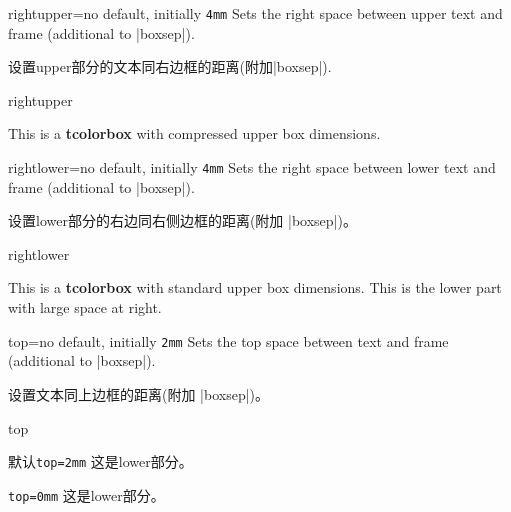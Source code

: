 \begin{docTcbKey}{rightupper}{=}{no default, initially \texttt{4mm}}
  Sets the right space between upper text and frame (additional to |boxsep|).

设置upper部分的文本同右边框的距离(附加|boxsep|).
\begin{exdispExample}{rightupper}

\begin{tcolorbox}[width=5cm,rightupper=2cm,title=My very long title text]
This is a \textbf{tcolorbox} with compressed upper box dimensions.
\end{tcolorbox}
\end{exdispExample}
\end{docTcbKey}





\begin{docTcbKey}{rightlower}{=}{no default, initially \texttt{4mm}}
  Sets the right space between lower text and frame (additional to |boxsep|).

设置lower部分的右边同右侧边框的距离(附加 |boxsep|)。
\begin{exdispExample}{rightlower}

\begin{tcolorbox}[width=5cm,rightlower=2cm]
This is a \textbf{tcolorbox} with standard upper box dimensions.
\tcblower
This is the lower part with large space at right.
\end{tcolorbox}
\end{exdispExample}
\end{docTcbKey}



\begin{docTcbKey}{top}{=}{no default, initially \texttt{2mm}}
Sets the top space between text and frame (additional to |boxsep|).

设置文本同上边框的距离(附加 |boxsep|)。
\begin{exdispExample}{top}

\begin{tcolorbox}[]
默认\verb|top=2mm|
\tcblower
这是lower部分。
\end{tcolorbox}
\begin{tcolorbox}[top=0mm]
\verb|top=0mm|
\tcblower
这是lower部分。
\end{tcolorbox}
\end{exdispExample}
\end{docTcbKey}


